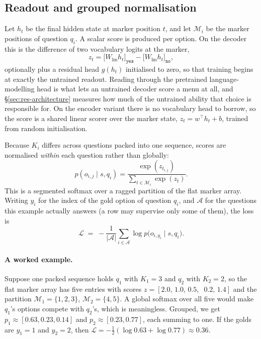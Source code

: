 \subsection{Readout and grouped normalisation}

Let $h_t$ be the final hidden state at marker position $t$, and let
$\mathcal{M}_i$ be the marker positions of question $q_i$. A scalar score
is produced per option. On the decoder this is the difference of two
vocabulary logits at the marker,
\begin{equation}
  z_t = \big[W_{\text{lm}} h_t\big]_{\texttt{yes}} - \big[W_{\text{lm}}
  h_t\big]_{\texttt{no}},
  \label{eq:yesno}
\end{equation}
optionally plus a residual head $g(h_t)$ initialised to zero, so that
training begins at exactly the untrained readout. Reading through the
pretrained language-modelling head is what lets an untrained decoder
score a menu at all, and \S\ref{sec:res-architecture} measures how much
of the untrained ability that choice is responsible for. On the encoder
variant there is no vocabulary head to borrow, so the score is a shared
linear scorer over the marker state, $z_t = w^\top h_t + b$, trained from
random initialisation.

Because $K_i$ differs across questions packed into one sequence, scores are
normalised \emph{within} each question rather than globally:
\begin{equation}
  p(o_{i,j}\mid s,q_i) = \frac{\exp(z_{t_{i,j}})}{\sum_{t\in\mathcal{M}_i}
  \exp(z_t)} .
  \label{eq:grouped}
\end{equation}
This is a segmented softmax over a ragged partition of the flat marker
array. Writing $y_i$ for the index of the gold option of question $q_i$,
and $\mathcal{A}$ for the questions this example actually answers (a row
may supervise only some of them), the loss is
\begin{equation}
  \mathcal{L} \;=\; -\frac{1}{|\mathcal{A}|}
  \sum_{i \in \mathcal{A}} \log p\big(o_{i,y_i} \mid s, q_i\big).
  \label{eq:loss}
\end{equation}

\paragraph{A worked example.} Suppose one packed sequence holds $q_1$ with
$K_1{=}3$ and $q_2$ with $K_2{=}2$, so the flat marker array has five
entries with scores $z = [2.0,\,1.0,\,0.5,\;\;0.2,\,1.4]$ and the
partition $\mathcal{M}_1 = \{1,2,3\}$, $\mathcal{M}_2 = \{4,5\}$. A global
softmax over all five would make $q_1$'s options compete with $q_2$'s,
which is meaningless. Grouped, we get $p_1 \approx [0.63, 0.23, 0.14]$ and
$p_2 \approx [0.23, 0.77]$, each summing to one. If the golds are
$y_1{=}1$ and $y_2{=}2$, then $\mathcal{L} = -\tfrac{1}{2}(\log 0.63 +
\log 0.77) \approx 0.36$.

